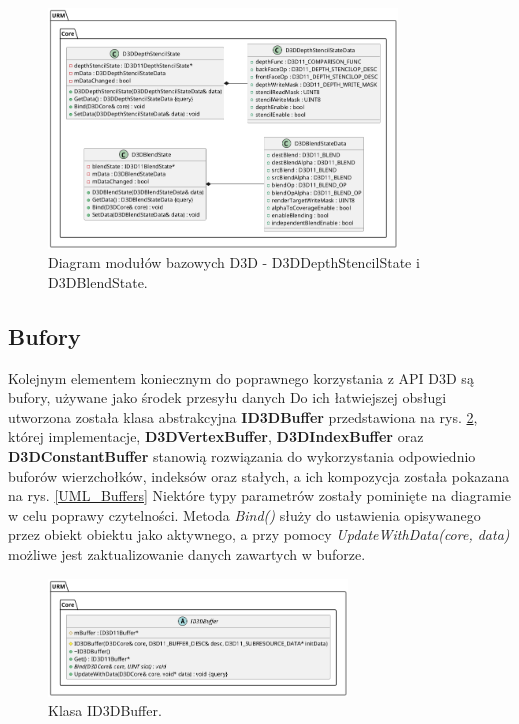 	\begin{figure}[h!]
		\centering
		\includegraphics[width=350px]{images/UML/d3dutils_2.png}
		\caption{Diagram modułów bazowych D3D - D3DDepthStencilState i D3DBlendState.}
		\label{UML_D3DUtils_2}
	\end{figure}
	
	\vfill
	\clearpage
	
\subsection{Bufory}
	Kolejnym elementem koniecznym do poprawnego korzystania z API D3D są bufory, używane jako środek przesyłu danych 
	Do ich łatwiejszej obsługi utworzona została klasa abstrakcyjna \textbf{ID3DBuffer} przedstawiona na rys. \ref{UML_Buffer}, której implementacje, \textbf{D3DVertexBuffer}, \textbf{D3DIndexBuffer} oraz \textbf{D3DConstantBuffer} stanowią rozwiązania do wykorzystania odpowiednio buforów wierzchołków, indeksów oraz stałych, a ich kompozycja została pokazana na rys. \ref{UML_Buffers}
	Niektóre typy parametrów zostały pominięte na diagramie w celu poprawy czytelności.
	Metoda \textit{Bind()} służy do ustawienia opisywanego przez obiekt obiektu jako aktywnego, a przy pomocy \textit{UpdateWithData(core, data)} możliwe jest zaktualizowanie danych zawartych w buforze.
		
	\begin{figure}[h!]
		\centering
		\includegraphics[width=300px]{images/UML/buffer.png}
		\caption{Klasa ID3DBuffer.}
		\label{UML_Buffer}
	\end{figure}
	
